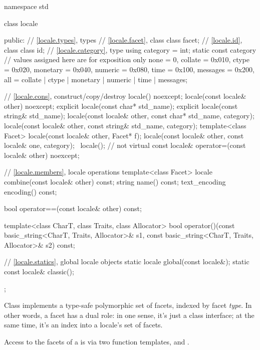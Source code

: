 \begin{codeblock}
namespace std {
  class locale {
  public:
    // \ref{locale.types}, types
    // \ref{locale.facet}, class 
    class facet;
    // \ref{locale.id}, class 
    class id;
    // \ref{locale.category}, type 
    using category = int;
    static const category   // values assigned here are for exposition only
      none     = 0,
      collate  = 0x010, ctype    = 0x020,
      monetary = 0x040, numeric  = 0x080,
      time     = 0x100, messages = 0x200,
      all = collate | ctype | monetary | numeric | time | messages;

    // \ref{locale.cons}, construct/copy/destroy
    locale() noexcept;
    locale(const locale& other) noexcept;
    explicit locale(const char* std_name);
    explicit locale(const string& std_name);
    locale(const locale& other, const char* std_name, category);
    locale(const locale& other, const string& std_name, category);
    template<class Facet> locale(const locale& other, Facet* f);
    locale(const locale& other, const locale& one, category);
    ~locale();                  // not virtual
    const locale& operator=(const locale& other) noexcept;

    // \ref{locale.members}, locale operations
    template<class Facet> locale combine(const locale& other) const;
    string name() const;
    text_encoding encoding() const;

    bool operator==(const locale& other) const;

    template<class CharT, class Traits, class Allocator>
      bool operator()(const basic_string<CharT, Traits, Allocator>& s1,
                      const basic_string<CharT, Traits, Allocator>& s2) const;

    // \ref{locale.statics}, global locale objects
    static       locale  global(const locale&);
    static const locale& classic();
  };
}
\end{codeblock}

\pnum
Class  implements a type-safe polymorphic set of facets,
indexed by facet \textit{type}.
In other words, a facet has a dual role:
in one sense, it's just a class interface;
at the same time, it's an index into a locale's set of facets.

\pnum
Access to the facets of a  is via two function templates,
 and .

